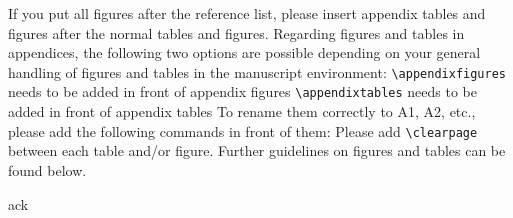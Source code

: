 \documentclass[gc, manuscript]{copernicus}
\begin{document}
If you put all figures after the reference list, please insert appendix tables and figures after the normal tables and figures.
Regarding figures and tables in appendices, the following two options are possible depending on your general handling of figures and tables in the manuscript environment:
\texttt{\textbackslash{}appendixfigures} needs to be added in front of appendix figures
\texttt{\textbackslash{}appendixtables} needs to be added in front of appendix tables
To rename them correctly to A1, A2, etc., please add the following commands in front of them:
Please add \texttt{\textbackslash{}clearpage} between each table and/or figure. Further guidelines on figures and tables can be found below.
\noappendix




\begin{acknowledgements}
ack
\end{acknowledgements}







\end{document}
